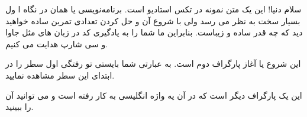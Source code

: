 \documentclass{article}
\begin{document}
	سلام دنیا! این یک متن نمونه در تکس استادیو است. برنامه‌نویسی یا همان 
	در نگاه ا ول بسیار سخت به نظر می رسد ولی با شروع آن و حل کردن تعدادی تمرین ساده خواهید دید که چه قدر ساده و زیباست.
    بنابراین ما شما را به یادگیری کد در زبان های مثل جاوا 
 و سی شارپ هدایت می کنیم. 
\par
	این شروع یا آغاز پارگراف دوم است. به عبارتی شما بایستی تو رفتگی اول سطر را در ابتدای این سطر مشاهده نمایید.
	
	این یک پارگراف دیگر است که در آن یه واژه انگلیسی 
به کار رفته است و می توانید آن را ببینید.
\end{document}
